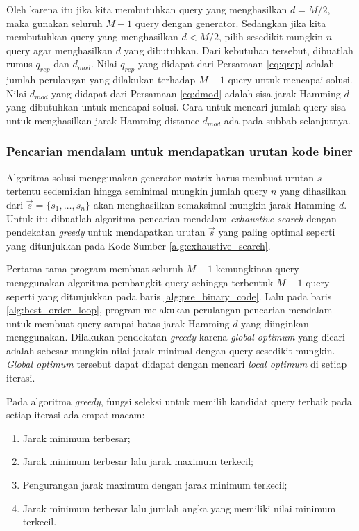 Oleh karena itu jika kita membutuhkan query yang menghasilkan $d = M/2$, maka gunakan seluruh $M-1$ query dengan generator. Sedangkan jika kita membutuhkan query yang menghasilkan $d < M/2$, pilih sesedikit mungkin $n$ query agar menghasilkan $d$ yang dibutuhkan. Dari kebutuhan tersebut, dibuatlah rumus $q_{rep}$ dan $d_{mod}$. Nilai $q_{rep}$ yang didapat dari Persamaan \ref{eq:qrep} adalah jumlah perulangan yang dilakukan terhadap $M-1$ query untuk mencapai solusi. Nilai $d_{mod}$ yang didapat dari Persamaan \ref{eq:dmod} adalah sisa jarak Hamming $d$ yang dibutuhkan untuk mencapai solusi. Cara untuk mencari jumlah query sisa untuk menghasilkan jarak Hamming distance $d_{mod}$ ada pada subbab selanjutnya.

\subsubsection{Pencarian mendalam untuk mendapatkan urutan kode biner}

Algoritma solusi menggunakan generator matrix harus membuat urutan $s$ tertentu sedemikian hingga seminimal mungkin jumlah query $n$ yang dihasilkan dari $\vec{s} = \{s_1, \ldots, s_n\}$ akan menghasilkan semaksimal mungkin jarak Hamming $d$. Untuk itu dibuatlah algoritma pencarian mendalam \textit{exhaustive search} dengan pendekatan \textit{greedy} untuk mendapatkan urutan $\vec{s}$ yang paling optimal seperti yang ditunjukkan pada Kode Sumber \ref{alg:exhaustive_search}.

Pertama-tama program membuat seluruh $M-1$ kemungkinan query menggunakan algoritma pembangkit query sehingga terbentuk $M-1$ query seperti yang ditunjukkan pada baris \ref{alg:pre_binary_code}. Lalu pada baris \ref{alg:best_order_loop}, program melakukan perulangan pencarian mendalam untuk membuat query sampai batas jarak Hamming $d$ yang diinginkan menggunakan. Dilakukan pendekatan \textit{greedy} karena \textit{global optimum} yang dicari adalah sebesar mungkin nilai jarak minimal dengan query sesedikit mungkin. \textit{Global optimum} tersebut dapat didapat dengan mencari \textit{local optimum} di setiap iterasi.

Pada algoritma \textit{greedy}, fungsi seleksi untuk memilih kandidat query terbaik pada setiap iterasi ada empat macam:
\begin{enumerate}
  \item Jarak minimum terbesar;
  \item Jarak minimum terbesar lalu jarak maximum terkecil;
  \item Pengurangan jarak maximum dengan jarak minimum terkecil;
  \item Jarak minimum terbesar lalu jumlah angka yang memiliki nilai minimum terkecil.
\end{enumerate}

